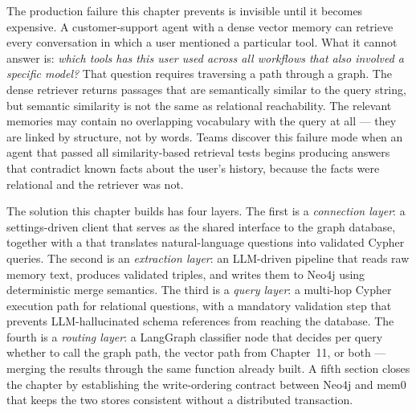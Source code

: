 

The production failure this chapter prevents is invisible until it becomes
expensive. A customer-support agent with a dense vector memory can retrieve
every conversation in which a user mentioned a particular tool. What it
cannot answer is: \emph{which tools has this user used across all workflows
that also involved a specific model?} That question requires traversing a
path through a graph. The dense retriever returns passages that are
semantically similar to the query string, but semantic similarity is not
the same as relational reachability. The relevant memories may contain no
overlapping vocabulary with the query at all --- they are linked by structure,
not by words. Teams discover this failure mode when an agent that passed all
similarity-based retrieval tests begins producing answers that contradict
known facts about the user's history, because the facts were relational and
the retriever was not.

The solution this chapter builds has four layers. The first is a
\emph{connection layer}: a settings-driven  client that
serves as the shared interface to the graph database, together with a
 that translates natural-language questions into
validated Cypher queries. The second is an \emph{extraction layer}: an
LLM-driven pipeline that reads raw memory text, produces validated
 triples, and writes them to Neo4j
using deterministic merge semantics. The third is a \emph{query layer}: a
multi-hop Cypher execution path for relational questions, with a mandatory
validation step that prevents LLM-hallucinated schema references from
reaching the database. The fourth is a \emph{routing layer}: a LangGraph
classifier node that decides per query whether to call the graph path, the
vector path from Chapter~11, or both --- merging the results through the
same  function already built. A fifth section
closes the chapter by establishing the write-ordering contract between
Neo4j and mem0 that keeps the two stores consistent without a distributed
transaction.

